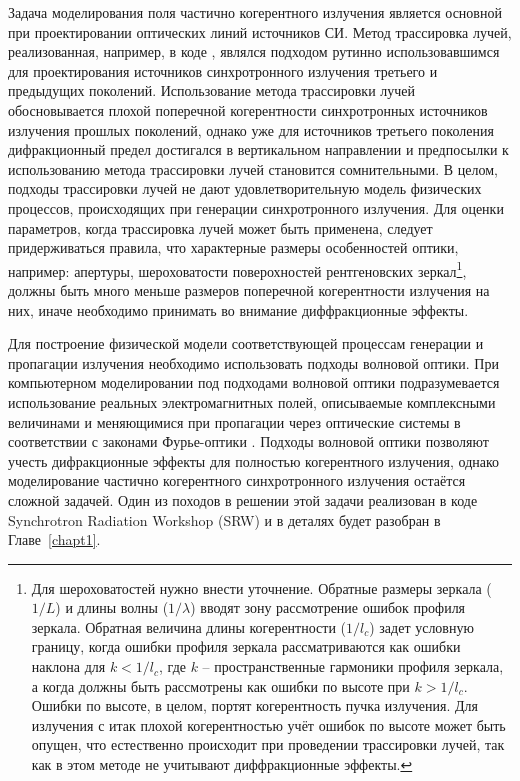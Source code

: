 Задача моделирования поля частично когерентного излучения является основной при проектировании оптических линий источников СИ. Метод трассировка лучей, реализованная, например, в коде \cite{sanchez_del_rio_shadow3_2011}, являлся подходом рутинно использовавшимся для проектирования источников синхротронного излучения третьего и предыдущих поколений. Использование метода трассировки лучей обосновывается плохой поперечной когерентности синхротронных источников излучения прошлых поколений, однако уже для источников третьего поколения дифракционный предел достигался в вертикальном направлении и предпосылки к использованию метода трассировки лучей становится сомнительными. В целом, подходы трассировки лучей не дают удовлетворительную модель физических процессов, происходящих при генерации синхротронного излучения. Для оценки параметров, когда трассировка лучей может быть применена, следует придерживаться правила, что характерные размеры особенностей оптики, например: апертуры, шероховатости поверохностей рентгеновских зеркал\footnote{Для шероховатостей нужно внести уточнение. Обратные размеры  зеркала ($1/L$) и длины волны ($1/\lambda$) вводят зону рассмотрение ошибок профиля зеркала. Обратная величина длины когерентности ($1/l_c$) задет условную границу, когда ошибки профиля зеркала рассматриваются как ошибки наклона для $k < 1/l_c$, где $k$ -- пространственные гармоники профиля зеркала, а когда должны быть рассмотрены как ошибки по высоте при $k > 1/l_c$. Ошибки по высоте, в целом, портят когерентность пучка излучения. Для излучения с итак плохой когерентностью учёт ошибок по высоте может быть опущен, что естественно происходит при проведении трассировки лучей, так как в этом методе не учитывают диффракционные эффекты.}, должны быть много меньше размеров поперечной когерентности излучения на них, иначе необходимо принимать во внимание диффракционные эффекты.

Для построение физической модели соответствующей процессам генерации и пропагации излучения необходимо использовать подходы волновой оптики. При компьютерном моделировании под подходами волновой оптики подразумевается использование реальных электромагнитных полей, описываемые комплексными величинами и меняющимися при пропагации через оптические системы в соответствии с законами Фурье-оптики \cite{goodman_introduction_2005}. Подходы волновой оптики позволяют учесть дифракционные эффекты для полностью когерентного излучения, однако моделирование частично когерентного синхротронного излучения остаётся сложной задачей. Один из походов в решении этой задачи реализован в коде Synchrotron Radiation Workshop (SRW) \cite{chubar_accurate_1998} и в деталях будет разобран в Главе~\ref{chapt1}.

